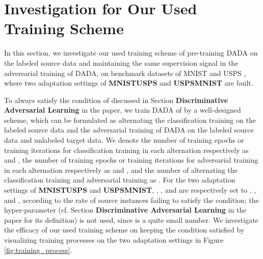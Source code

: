 \documentclass[letterpaper]{article} \usepackage{aaai20}  \usepackage{times}  \usepackage{helvet} \usepackage{courier}  \usepackage[hyphens]{url}  \usepackage{graphicx} \urlstyle{rm} \def\UrlFont{\rm}  \usepackage{graphicx}  \frenchspacing  \setlength{\pdfpagewidth}{8.5in}  \setlength{\pdfpageheight}{11in}
\begin{document}
\section{Investigation for Our Used Training Scheme} 
\label{sec5}
In this section, we investigate our used training scheme of pre-training DADA on the labeled source data and maintaining the same supervision signal in the adversarial training of DADA, on benchmark datasets of MNIST \cite{mnist} and USPS \cite{usps}, where two adaptation settings of \textbf{MNIST}\textbf{USPS} and \textbf{USPS}\textbf{MNIST} are built.

To always satisfy the condition of  discussed in Section \textbf{Discriminative Adversarial Learning} in the paper, we train DADA of  by a well-designed scheme, which can be formulated as alternating the classification training on the labeled source data and the adversarial training of DADA on the labeled source data and unlabeled target data. We denote the number of training epochs or training iterations for classification training in each alternation respectively as  and , the number of training epochs or training iterations for adversarial training in each alternation respectively as  and , and the number of alternating the classification training and adversarial training as . For the two adaptation settings of \textbf{MNIST}\textbf{USPS} and \textbf{USPS}\textbf{MNIST}, , , and  are respectively set to , , and , according to the rate of source instances failing to satisfy the condition; the hyper-parameter  (cf. Section \textbf{Discriminative Adversarial Learning} in the paper for its definition) is not used, since  is a quite small number. We investigate the efficacy of our used training scheme on keeping the condition satisfied by visualizing training processes on the two adaptation settings in Figure \ref{fig:training_process}. 
\end{document}
